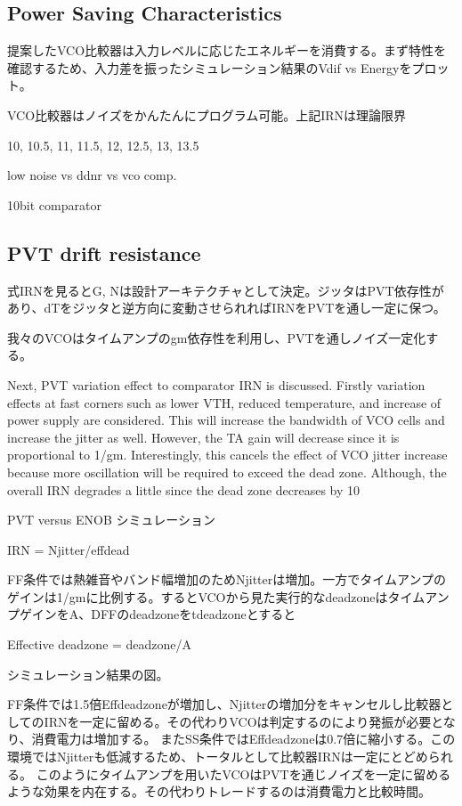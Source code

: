 \documentclass[letterpaper, 10 pt, conference]{ieeeconf}  %
\begin{document}
\subsection{Power Saving Characteristics}
提案したVCO比較器は入力レベルに応じたエネルギーを消費する。まず特性を確認するため、入力差を振ったシミュレーション結果のVdif vs Energyをプロット。

VCO比較器はノイズをかんたんにプログラム可能。上記IRNは理論限界

10, 10.5, 11, 11.5, 12, 12.5, 13, 13.5

low noise vs ddnr vs vco comp.

10bit comparator

\subsection{PVT drift resistance}
式IRNを見るとG, Nは設計アーキテクチャとして決定。ジッタはPVT依存性があり、dTをジッタと逆方向に変動させられればIRNをPVTを通し一定に保つ。

我々のVCOはタイムアンプのgm依存性を利用し、PVTを通しノイズ一定化する。

Next, PVT variation effect to comparator IRN is discussed. Firstly variation effects at fast corners such as lower VTH, reduced temperature, and increase of power supply are considered. This will increase the bandwidth of VCO cells and increase the jitter as well. However, the TA gain will decrease since it is proportional to 1/gm. Interestingly, this cancels the effect of VCO jitter increase because more oscillation will be required to exceed the dead zone. Although, the overall IRN degrades a little since the dead zone decreases by 10%

PVT versus ENOB シミュレーション

IRN = Njitter/effdead

FF条件では熱雑音やバンド幅増加のためNjitterは増加。一方でタイムアンプのゲインは1/gmに比例する。するとVCOから見た実行的なdeadzoneはタイムアンプゲインをA、DFFのdeadzoneをtdeadzoneとすると

Effective deadzone = deadzone/A

シミュレーション結果の図。

FF条件では1.5倍Effdeadzoneが増加し、Njitterの増加分をキャンセルし比較器としてのIRNを一定に留める。その代わりVCOは判定するのにより発振が必要となり、消費電力は増加する。
またSS条件ではEffdeadzoneは0.7倍に縮小する。この環境ではNjitterも低減するため、トータルとして比較器IRNは一定にとどめられる。
このようにタイムアンプを用いたVCOはPVTを通じノイズを一定に留めるような効果を内在する。その代わりトレードするのは消費電力と比較時間。
\end{document}
